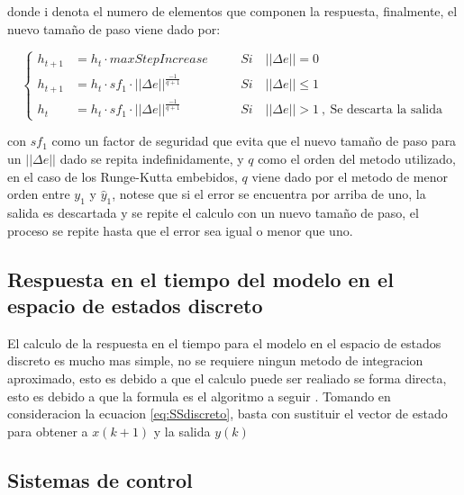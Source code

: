                 \noindent donde i denota el numero de elementos que componen la respuesta, finalmente, el nuevo tamaño de paso viene dado por:
                
                \begin{equation}
                    \left\{
                    \begin{aligned}
                        h_{t+1} &= h_{t}\cdot maxStepIncrease &\quad &Si \quad ||\Delta e|| = 0\\
                        h_{t+1} &= h_{t}\cdot sf_1 \cdot ||\Delta e||^{\frac{-1}{q+1}}  &\quad &Si \quad ||\Delta e|| \leq 1 \\
                        h_{t} &= h_{t}\cdot sf_1 \cdot ||\Delta e||^{\frac{-1}{q+1}}  &\quad &Si \quad ||\Delta e|| > 1 \ ,\ \text{Se descarta la salida}
                    \end{aligned}\right.
                \end{equation}
                
                \noindent con $sf_1$ como un factor de seguridad que evita que el nuevo tamaño de paso para un $||\Delta e||$ dado se repita indefinidamente, y $q$ como el orden del metodo utilizado, en el caso de los Runge-Kutta embebidos, $q$ viene dado por el metodo de menor orden entre $y_1$ y $\hat{y}_1$, notese que si el error se encuentra por arriba de uno, la salida es descartada y se repite el calculo con un nuevo tamaño de paso, el proceso se repite hasta que el error sea igual o menor que uno.
    
    \subsection{Respuesta en el tiempo del modelo en el espacio de estados discreto}
        
        El calculo de la respuesta en el tiempo para el modelo en el espacio de estados discreto es mucho mas simple, no se requiere ningun metodo de integracion aproximado, esto es debido a que el calculo puede ser realiado se forma directa, esto es debido a que la formula es el algoritmo a seguir \Parencite{haugen2005discrete}. Tomando en consideracion la ecuacion \cref{eq:SSdiscreto}, basta con sustituir el vector de estado para obtener a $x(k+1)$ y la salida $y(k)$
    
    \subsection{Sistemas de control}
		
